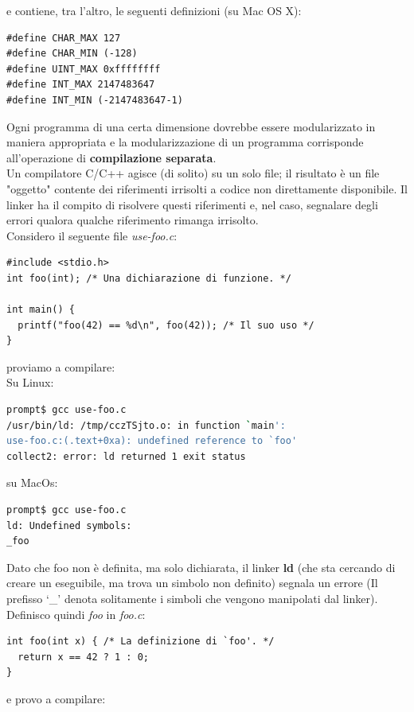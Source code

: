 \documentclass[a4paper,12pt, oneside]{book}
\begin{document}
	e contiene, tra l'altro, le seguenti definizioni (su Mac OS X):
	\begin{verbatim}
#define CHAR_MAX 127
#define CHAR_MIN (-128)
#define UINT_MAX 0xffffffff
#define INT_MAX 2147483647
#define INT_MIN (-2147483647-1)
\end{verbatim}
	Ogni programma di una certa dimensione dovrebbe essere
	modularizzato in maniera appropriata e la modularizzazione di un programma corrisponde
	all'operazione di \textbf{compilazione separata}.\\
	Un compilatore C/C++ agisce (di solito) su un solo file; il
	risultato è un file "oggetto" contente dei riferimenti irrisolti a codice non direttamente disponibile. Il linker ha il compito di risolvere questi riferimenti e, nel caso,
	segnalare degli errori qualora qualche riferimento rimanga
	irrisolto.\\
	Considero il seguente file \textit{use-foo.c}:
	\begin{verbatim}
#include <stdio.h>
int foo(int); /* Una dichiarazione di funzione. */

int main() {
  printf("foo(42) == %d\n", foo(42)); /* Il suo uso */
}
\end{verbatim}
	proviamo a compilare:\\
	Su Linux:
	\begin{shaded}
		\begin{lstlisting}[language=bash]
prompt$ gcc use-foo.c 
/usr/bin/ld: /tmp/cczTSjto.o: in function `main':
use-foo.c:(.text+0xa): undefined reference to `foo'
collect2: error: ld returned 1 exit status
\end{lstlisting}
	\end{shaded}
	su MacOs:
	\begin{shaded}
		\begin{lstlisting}[language=bash]
prompt$ gcc use-foo.c
ld: Undefined symbols:
_foo
\end{lstlisting}
	\end{shaded}
	Dato che foo non è definita, ma solo dichiarata, il linker \textbf{ld} (che sta cercando di
	creare un eseguibile, ma trova un simbolo non definito) segnala un errore (Il prefisso ‘\_' denota solitamente i simboli che vengono manipolati dal linker).\\
	Definisco quindi \textit{foo} in \textit{foo.c}:
	\begin{verbatim}
int foo(int x) { /* La definizione di `foo'. */
  return x == 42 ? 1 : 0;
}
\end{verbatim}
	e provo a compilare:\\
\end{document}
